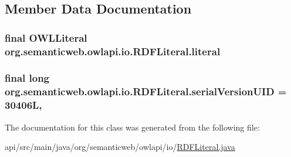 \subsection{Member Data Documentation}
\hypertarget{classorg_1_1semanticweb_1_1owlapi_1_1io_1_1_r_d_f_literal_ad3d2bd5f19ddbc20617217dd4f2a24d8}{
\subsubsection[{literal}]{\setlength{\rightskip}{0pt plus 5cm}final {\bf O\-W\-L\-Literal} org.\-semanticweb.\-owlapi.\-io.\-R\-D\-F\-Literal.\-literal\hspace{0.3cm}{\ttfamily [private]}}}\label{classorg_1_1semanticweb_1_1owlapi_1_1io_1_1_r_d_f_literal_ad3d2bd5f19ddbc20617217dd4f2a24d8}
\hypertarget{classorg_1_1semanticweb_1_1owlapi_1_1io_1_1_r_d_f_literal_ae1c7530891e418f6a1489583ce707920}{
\subsubsection[{serial\-Version\-U\-I\-D}]{\setlength{\rightskip}{0pt plus 5cm}final long org.\-semanticweb.\-owlapi.\-io.\-R\-D\-F\-Literal.\-serial\-Version\-U\-I\-D = 30406\-L\hspace{0.3cm}{\ttfamily [static]}, {\ttfamily [private]}}}\label{classorg_1_1semanticweb_1_1owlapi_1_1io_1_1_r_d_f_literal_ae1c7530891e418f6a1489583ce707920}


The documentation for this class was generated from the following file\-:\begin{DoxyCompactItemize}
\item 
api/src/main/java/org/semanticweb/owlapi/io/\hyperlink{_r_d_f_literal_8java}{R\-D\-F\-Literal.\-java}\end{DoxyCompactItemize}
